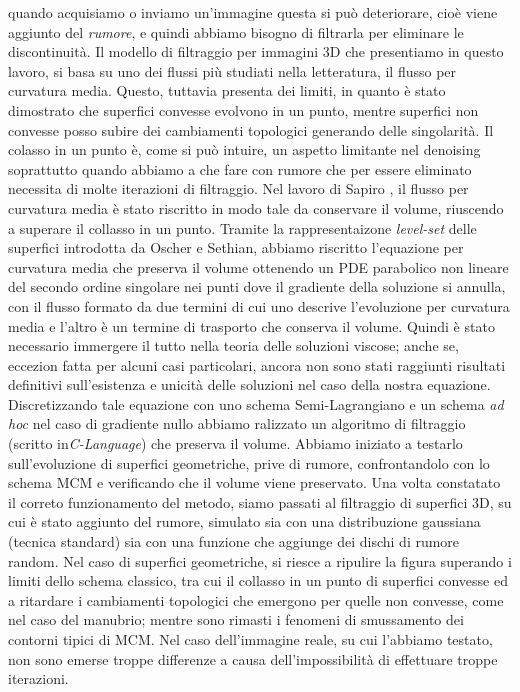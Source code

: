 quando acquisiamo o inviamo un'immagine questa si può deteriorare, cioè 
viene aggiunto del \emph{rumore}, e quindi abbiamo bisogno di
filtrarla per eliminare le discontinuità. Il modello di filtraggio per
immagini 3D che presentiamo in questo lavoro, si basa su uno dei flussi più
studiati nella letteratura, il flusso per curvatura media. Questo,
tuttavia presenta dei limiti, in quanto è stato dimostrato che
superfici convesse evolvono in un punto, mentre superfici
non convesse posso subire dei cambiamenti topologici generando delle
singolarità. Il colasso in un punto è, come si può intuire, un aspetto
limitante nel denoising soprattutto quando abbiamo a che fare con
rumore che per essere eliminato necessita di molte iterazioni
di filtraggio. Nel lavoro di Sapiro \cite[][]{gui:sapiro}, il
flusso per curvatura media è stato riscritto in modo tale da
conservare il volume, riuscendo a superare il collasso in un
punto. Tramite la rappresentaizone \emph{level-set} delle superfici
introdotta da Oscher e Sethian, abbiamo riscritto l'equazione per
curvatura media che preserva il volume ottenendo un PDE parabolico non
lineare del secondo ordine singolare nei punti dove il gradiente della
soluzione si annulla, con il flusso formato da due termini di cui uno
descrive l'evoluzione  per curvatura media e l'altro è un termine di
trasporto che conserva il volume. Quindi è stato necessario immergere
il tutto nella teoria delle soluzioni viscose; anche se, eccezion
fatta per alcuni casi particolari, ancora non sono stati raggiunti
risultati definitivi sull'esistenza e unicità delle soluzioni nel caso
della nostra equazione. Discretizzando tale equazione con uno schema
Semi-Lagrangiano e un schema \emph{ad hoc} nel caso di gradiente 
nullo abbiamo ralizzato un algoritmo di filtraggio (scritto
in\emph{C-Language}) che preserva il volume. Abbiamo iniziato a
testarlo sull'evoluzione di superfici geometriche, prive di rumore,
confrontandolo con lo schema MCM e verificando che il volume viene
preservato. Una volta constatato il correto funzionamento del metodo,
siamo passati al filtraggio di superfici 3D, su cui è stato aggiunto
del rumore, simulato sia con una distribuzione gaussiana (tecnica
standard) sia con una funzione che aggiunge dei dischi di rumore
random. Nel caso di superfici geometriche, si riesce a ripulire la
figura superando i limiti dello schema classico, tra cui il collasso
in un punto di superfici convesse ed a ritardare i cambiamenti topologici che
emergono per quelle non convesse, come nel caso del manubrio; mentre
sono rimasti i fenomeni di smussamento dei contorni tipici di MCM.
Nel caso dell'immagine reale, su cui l'abbiamo testato, non sono
emerse troppe differenze a causa dell'impossibilità di effettuare troppe
iterazioni.
 

